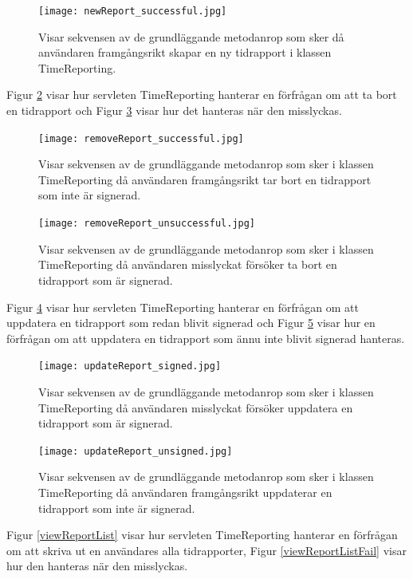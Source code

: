 \documentclass[a4paper]{article}
\begin{document}
\begin{figure}[h!]
\centering
\texttt{[image: newReport\_successful.jpg]}
\caption{Visar sekvensen av de grundläggande metodanrop som sker då användaren framgångsrikt skapar en ny tidrapport i klassen TimeReporting.
\label{newReport}}
\end{figure}

\noindent
Figur \ref{removeReport} visar hur servleten TimeReporting hanterar en förfrågan om att ta bort en tidrapport och Figur \ref{removeReportFail} visar hur det hanteras när den misslyckas.

\begin{figure}[h!]
\centering
\texttt{[image: removeReport\_successful.jpg]}
\caption{Visar sekvensen av de grundläggande metodanrop som sker i klassen TimeReporting då användaren framgångsrikt tar bort en tidrapport som inte är signerad.
\label{removeReport}}
\end{figure}

\begin{figure}[h!]
\centering
\texttt{[image: removeReport\_unsuccessful.jpg]}
\caption{Visar sekvensen av de grundläggande metodanrop som sker i klassen TimeReporting då användaren misslyckat försöker ta bort en tidrapport som är signerad.
\label{removeReportFail}}
\end{figure}

\noindent
Figur \ref{updateReportSigned} visar hur servleten TimeReporting hanterar en förfrågan om att uppdatera en tidrapport som redan blivit signerad och Figur \ref{updateReportUnsigned} visar hur en förfrågan om att uppdatera en tidrapport som ännu inte blivit signerad hanteras.

\begin{figure}[h!]
\centering
\texttt{[image: updateReport\_signed.jpg]}
\caption{Visar sekvensen av de grundläggande metodanrop som sker i klassen TimeReporting då användaren misslyckat försöker uppdatera en tidrapport som är signerad.
\label{updateReportSigned}}
\end{figure}

\begin{figure}[h!]
\centering
\texttt{[image: updateReport\_unsigned.jpg]}
\caption{Visar sekvensen av de grundläggande metodanrop som sker i klassen TimeReporting då användaren framgångsrikt uppdaterar en tidrapport som inte är signerad.
\label{updateReportUnsigned}}
\end{figure}

\noindent
Figur \ref{viewReportList} visar hur servleten TimeReporting hanterar en förfrågan om att skriva ut en användares alla tidrapporter, Figur \ref{viewReportListFail} visar hur den hanteras när den misslyckas.
\end{document}
